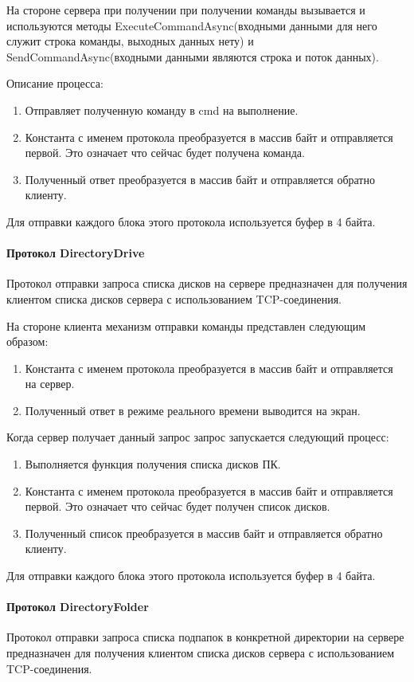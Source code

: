 На стороне сервера при получении при получении команды вызывается и используются методы ExecuteCommandAsync(входными данными для него служит строка команды, выходных данных нету) и SendCommandAsync(входными данными являются строка и поток данных). 

Описание процесса:
\begin{enumerate}
	\item Отправляет полученную команду в cmd на выполнение.
	\item Константа с именем протокола преобразуется в массив байт и отправляется первой. Это означает что сейчас будет получена команда.
	\item Полученный ответ преобразуется в массив байт и отправляется обратно клиенту.
\end{enumerate}

Для отправки каждого блока этого протокола используется буфер в 4 байта.

\paragraph{Протокол DirectoryDrive}
Протокол отправки запроса списка дисков на сервере предназначен для получения клиентом списка дисков сервера с использованием TCP-соединения. 

На стороне клиента механизм отправки команды представлен следующим образом:
\begin{enumerate}
	\item Константа с именем протокола преобразуется в массив байт и отправляется на сервер.
	\item Полученный ответ в режиме реального времени выводится на экран.
\end{enumerate}

Когда сервер получает данный запрос запрос запускается следующий процесс:
\begin{enumerate}
	\item Выполняется функция получения списка дисков ПК.
	\item Константа с именем протокола преобразуется в массив байт и отправляется первой. Это означает что сейчас будет получен список дисков.
	\item Полученный список преобразуется в массив байт и отправляется обратно клиенту.
\end{enumerate}

Для отправки каждого блока этого протокола используется буфер в 4 байта.

\paragraph{Протокол DirectoryFolder}
Протокол отправки запроса списка подпапок в конкретной директории на сервере предназначен для получения клиентом списка дисков сервера с использованием TCP-соединения. 

